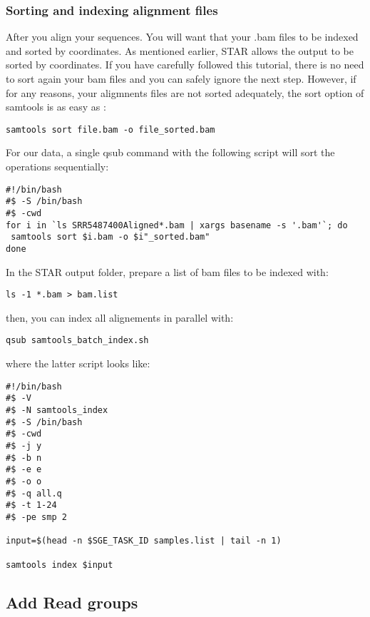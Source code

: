 \subsubsection{Sorting and indexing alignment files}


After you align your sequences. You will want that your .bam files to be indexed and sorted by coordinates. As mentioned earlier, STAR allows the output to be sorted by coordinates. If you have carefully followed this tutorial, there is no need to sort again your bam files and you can safely ignore the next step. However, if for any reasons, your aligmnents files are not sorted adequately, the sort option of samtools is as easy as :

\begin{verbatim}
samtools sort file.bam -o file_sorted.bam
\end{verbatim}

For our data, a single qsub command with the following script will sort the operations sequentially:


\begin{verbatim}
#!/bin/bash
#$ -S /bin/bash
#$ -cwd
for i in `ls SRR5487400Aligned*.bam | xargs basename -s '.bam'`; do
 samtools sort $i.bam -o $i"_sorted.bam"
done 
\end{verbatim}


In the STAR output folder, prepare a list of bam files to be indexed with:

\begin{verbatim}
ls -1 *.bam > bam.list
\end{verbatim}

then, you can index all alignements in parallel with:

\begin{verbatim}
qsub samtools_batch_index.sh
\end{verbatim}

where the latter script looks like:

\begin{verbatim}
#!/bin/bash
#$ -V
#$ -N samtools_index
#$ -S /bin/bash
#$ -cwd
#$ -j y
#$ -b n
#$ -e e
#$ -o o
#$ -q all.q
#$ -t 1-24
#$ -pe smp 2

input=$(head -n $SGE_TASK_ID samples.list | tail -n 1)

samtools index $input
\end{verbatim}





\subsection{Add Read groups}

